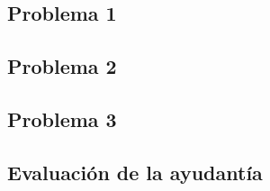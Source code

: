 \documentclass[12pt]{extarticle}
\begin{document}


\subsection*{Problema 1}


\subsection*{Problema 2}


\subsection*{Problema 3}


\newpage

\subsection*{Evaluación de la ayudantía}

\end{document}
